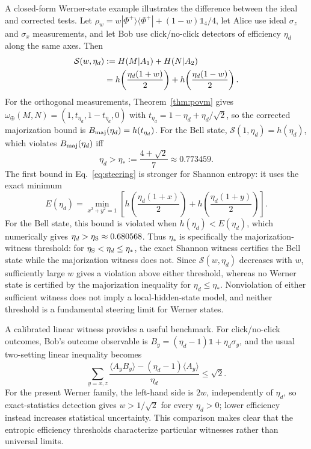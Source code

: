 \documentclass[aps,pra,twocolumn,superscriptaddress,nofootinbib,floatfix]{revtex4-2}
\theoremstyle{definition}
\newcommand{\bra}[1]{\langle #1|}
\newcommand{\ket}[1]{|#1\rangle}
\newcommand{\omplus}{\omega_{\oplus}}
\begin{document}
A closed-form Werner-state example illustrates the difference between the ideal
and corrected tests. Let
$\rho_w=w\ket{\Phi^+}\!\bra{\Phi^+}+(1-w)\mathds{1}_4/4$, let Alice use ideal
$\sigma_z$ and $\sigma_x$ measurements, and let Bob use click/no-click detectors
of efficiency $\eta_d$ along the same axes. Then
\begin{align}
  \mathcal S(w,\eta_d)&:=H(M|A_1)+H(N|A_2)\notag\\
  &=h\!\left(\frac{\eta_d(1+w)}2\right)
  +h\!\left(\frac{\eta_d(1-w)}2\right).
  \label{eq:werner-steering}
\end{align}
For the orthogonal measurements, Theorem~\ref{thm:povm} gives
$\omplus(M,N)=(1,t_{\eta_d},1-t_{\eta_d},0)$ with
$t_{\eta_d}=1-\eta_d+\eta_d/\sqrt2$, so the corrected majorization bound is
$B_{\rm maj}(\eta_d)=h(t_{\eta_d})$. For the Bell state,
$\mathcal S(1,\eta_d)=h(\eta_d)$, which violates $B_{\rm maj}(\eta_d)$ iff
\begin{equation}
  \eta_d>\eta_*:=\frac{4+\sqrt2}{7}\approx0.773459 .
  \label{eq:steering-efficiency}
\end{equation}
The first bound in Eq.~\eqref{eq:steering} is stronger for Shannon entropy: it
uses the exact minimum
\begin{equation}
  E(\eta_d)=\min_{x^2+y^2=1}\left[h\!\left(\frac{\eta_d(1+x)}2\right)
  +h\!\left(\frac{\eta_d(1+y)}2\right)\right].
  \label{eq:steering-exact}
\end{equation}
For the Bell state, this bound is violated when $h(\eta_d)<E(\eta_d)$, which
numerically gives $\eta_d>\eta_{\rm S}\approx0.680568$. Thus $\eta_*$ is
specifically the majorization-witness threshold: for
$\eta_{\rm S}<\eta_d\le\eta_*$, the exact Shannon witness certifies the Bell
state while the majorization witness does not. Since $\mathcal S(w,\eta_d)$
decreases with $w$, sufficiently large $w$ gives a violation above either
threshold, whereas no Werner state is certified by the majorization inequality
for $\eta_d\le\eta_*$. Nonviolation of either sufficient witness does not imply a
local-hidden-state model, and neither threshold is a fundamental steering limit
for Werner states.

A calibrated linear witness provides a useful benchmark. For click/no-click
outcomes, Bob's outcome observable is $B_y=(\eta_d-1)\mathds{1}+\eta_d\sigma_y$,
and the usual two-setting linear inequality becomes
\begin{equation}
  \sum_{y=x,z}\frac{\langle A_yB_y\rangle-(\eta_d-1)\langle A_y\rangle}{\eta_d}
  \le\sqrt2.
  \label{eq:linear-steering}
\end{equation}
For the present Werner family, the left-hand side is $2w$, independently of
$\eta_d$, so exact-statistics detection gives $w>1/\sqrt2$ for every $\eta_d>0$;
lower efficiency instead increases statistical uncertainty. This comparison
makes clear that the entropic efficiency thresholds characterize particular
witnesses rather than universal limits.
\end{document}
